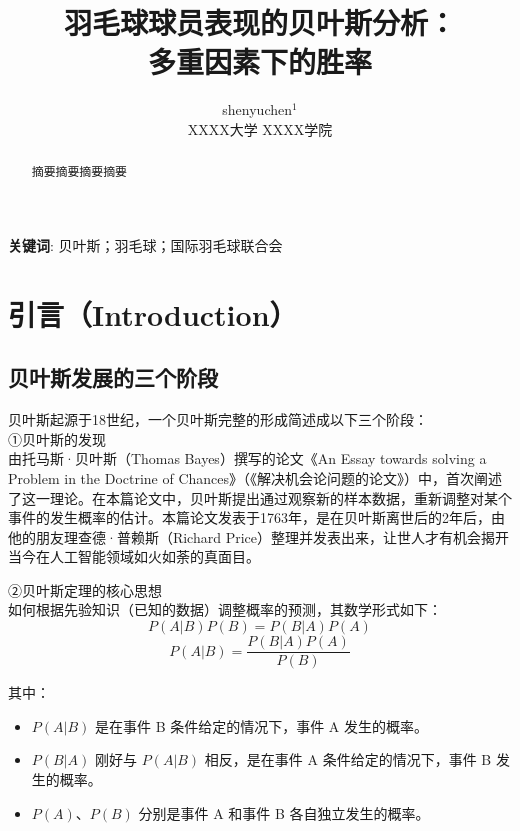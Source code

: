 \documentclass[12pt]{article}
\begin{document}
\title{羽毛球球员表现的贝叶斯分析：\\ 多重因素下的胜率}		%
\date{}

\author{shenyuchen$^1$		\\		XXXX大学 XXXX学院}		%
\maketitle

\begin{abstract}
	摘要摘要摘要摘要

\end{abstract}

\textbf{关键词}: 贝叶斯；羽毛球；国际羽毛球联合会


\section{引言（Introduction）}
\subsection{贝叶斯发展的三个阶段}
贝叶斯起源于18世纪，一个贝叶斯完整的形成简述成以下三个阶段：\\
①贝叶斯的发现 \\
由托马斯·贝叶斯（Thomas Bayes）撰写的论文《An Essay towards solving a Problem in the Doctrine of Chances》（《解决机会论问题的论文》）中，首次阐述了这一理论。在本篇论文中，贝叶斯提出通过观察新的样本数据，重新调整对某个事件的发生概率的估计。本篇论文发表于1763年，是在贝叶斯离世后的2年后，由他的朋友理查德·普赖斯（Richard Price）整理并发表出来，让世人才有机会揭开当今在人工智能领域如火如荼的真面目。

②贝叶斯定理的核心思想 \\
如何根据先验知识（已知的数据）调整概率的预测，其数学形式如下：
\begin{equation}
	P(A|B){P(B)}={P(B|A)P(A)}
	\end{equation}
\begin{equation}
    P(A|B)=\frac{P(B|A)P(A)}{P(B)}
\end{equation}

其中：
\begin{itemize}
	\item $P(A|B)$ 是在事件 B 条件给定的情况下，事件 A 发生的概率。
	\item $P(B|A)$ 刚好与 $P(A|B)$ 相反，是在事件 A 条件给定的情况下，事件 B 发生的概率。
	\item $P(A)$、$P(B)$ 分别是事件 A 和事件 B 各自独立发生的概率。
	\end{itemize}
\end{document}
